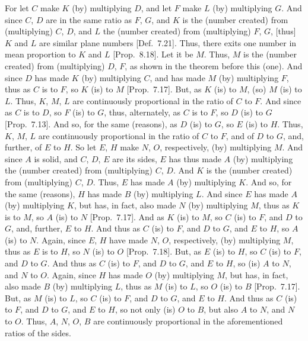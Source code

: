 For let $C$ make $K$ (by) multiplying $D$, and let $F$ make $L$
(by) multiplying $G$. And since $C$, $D$ are in the same ratio as $F$, $G$,
and $K$ is the (number created) from (multiplying) $C$, $D$, and $L$ the (number created) from
(multiplying) $F$, $G$, [thus] $K$ and $L$ are  similar plane numbers [Def.~7.21]. Thus, there exits one number
in mean proportion to $K$ and $L$ [Prop.~8.18].
Let it be $M$. Thus, $M$ is the (number created) from (multiplying) $D$, $F$, as shown in the theorem before this (one). And since $D$ has made $K$ (by) multiplying $C$, and has made $M$ (by) multiplying $F$, thus as $C$ is to $F$, so
$K$ (is) to $M$ [Prop.~7.17]. But, as $K$ (is) to $M$, (so) $M$ (is) to $L$. Thus, $K$, $M$, $L$ are continuously
proportional in the ratio of $C$ to $F$. And since as $C$ is to $D$, so $F$
(is) to $G$, thus, alternately, as $C$ is to $F$, so $D$ (is) to $G$ [Prop.~7.13]. And so, for the same (reasons), 
as $D$ (is) to $G$, so $E$ (is) to $H$. Thus, $K$, $M$, $L$ are continuously
proportional in the ratio of $C$ to $F$, and of $D$ to $G$, and, further,  of $E$ to $H$. So let  $E$, $H$ make  $N$, $O$, respectively, (by) multiplying $M$. And since $A$ is  solid, and $C$, $D$, $E$ are its sides, $E$ has thus made $A$ (by) multiplying the (number created) from
(multiplying) $C$, $D$. And  $K$ 
is the (number created) from (multiplying)
$C$, $D$. Thus, $E$ has made $A$ (by) multiplying $K$. And so, for the
same (reasons), $H$ has made $B$ (by) multiplying $L$. And since
$E$ has made $A$ (by) multiplying $K$, but has, in fact, also made $N$ (by)
multiplying $M$, thus as $K$ is to $M$, so $A$ (is) to $N$ [Prop.~7.17].  And as $K$ (is) to $M$, so
$C$ (is) to $F$, and $D$ to $G$, and, further, $E$ to $H$. And thus as $C$
(is) to $F$, and $D$ to $G$, and $E$ to $H$, so $A$ (is) to $N$. Again, since
 $E$, $H$ have made  $N$, $O$, respectively, (by) multiplying $M$,
thus as $E$ is to $H$, so $N$ (is) to $O$ [Prop.~7.18]. But, as $E$ (is) to $H$, so $C$
(is) to $F$, and $D$ to $G$.  And thus as $C$ (is) to $F$, and $D$ to $G$,
and $E$ to $H$, so (is) $A$ to $N$, and $N$ to $O$. Again, since
$H$ has made $O$ (by) multiplying $M$, but  has, in fact, also made
$B$ (by) multiplying $L$, thus as $M$ (is) to $L$, so $O$ (is) to $B$ [Prop.~7.17]. But, as $M$ (is) to $L$, so $C$ (is)
to $F$, and $D$ to $G$, and $E$ to $H$. And thus as $C$ (is) to $F$,
and $D$ to $G$, and $E$ to $H$, so not only (is) $O$ to $B$, but
also $A$ to $N$, and $N$ to $O$. Thus,	 $A$, $N$, $O$, $B$ are continuously proportional in the aforementioned ratios of the sides.

